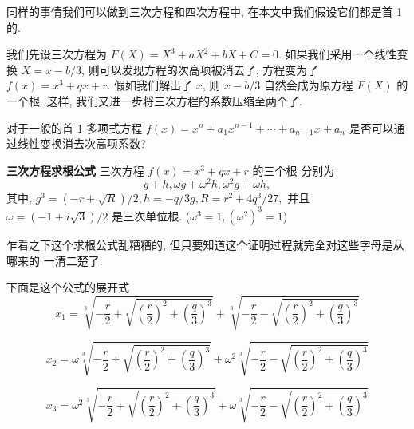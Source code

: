 \documentclass[UTF8]{book}
\begin{document}
同样的事情我们可以做到三次方程和四次方程中, 在本文中我们假设它们都是首 1 的. 

我们先设三次方程为 $F(X) = X^3+aX^2+bX+C=0$. 
如果我们采用一个线性变换 $ X = x-b/3 $, 
则可以发现方程的次高项被消去了, 方程变为了 $f(x) = x^3 + qx + r$. 
假如我们解出了 $x$, 则 $x-b/3$ 自然会成为原方程 $F(X)$ 的一个根. 
这样, 我们又进一步将三次方程的系数压缩至两个了. 

\begin{exercise}
    对于一般的首 1 多项式方程 $f(x) = x^n + a_1x^{n-1} + 
    \cdots + a_{n-1}x + a_n$ 是否可以通过线性变换消去次高项系数?
\end{exercise}

\begin{theorem}
    \textbf{三次方程求根公式} 三次方程 $f(x) = x^3 + qx + r$ 的三个根
    分别为 $$ g + h , \omega g + \omega ^2 h , \omega^2 g + \omega h, $$
    其中, $ g^3 = (-r + \sqrt{R})/2, h = -q/3g, R = r^2 + 4q^3/27, $
    并且
    $\omega = (-1+i\sqrt{3})/2 $ 是三次单位根. 
    ($\omega^3=1 , (\omega^2)^3 =1$) 
\end{theorem}

乍看之下这个求根公式乱糟糟的, 但只要知道这个证明过程就完全对这些字母是从哪来的
一清二楚了. 

下面是这个公式的展开式
$$ x_{1}=\sqrt[3]{-\frac{r}{2}+\sqrt{(\frac{r}{2})^{2}+(\frac{q}{3})^{3}}}
+\sqrt[3]{-\frac{r}{2}-\sqrt{(\frac{r}{2})^{2}+(\frac{q}{3})^{3}}}$$

\[x_{2}=\omega\sqrt[3]{-\frac{r}{2}+\sqrt{(\frac{r}{2})^{2}+
(\frac{q}{3})^{3}}}+\omega^{2}\sqrt[3]{-\frac{r}{2}-
\sqrt{(\frac{r}{2})^{2}+(\frac{q}{3})^{3}}}\]

\[x_{3}=\omega^{2}\sqrt[3]{-\frac{r}{2}+\sqrt{(\frac{r}{2})^{2}
+(\frac{q}{3})^{3}}}+\omega\sqrt[3]{-\frac{r}{2}-
\sqrt{(\frac{r}{2})^{2}+(\frac{q}{3})^{3}}}\]
\end{document}
